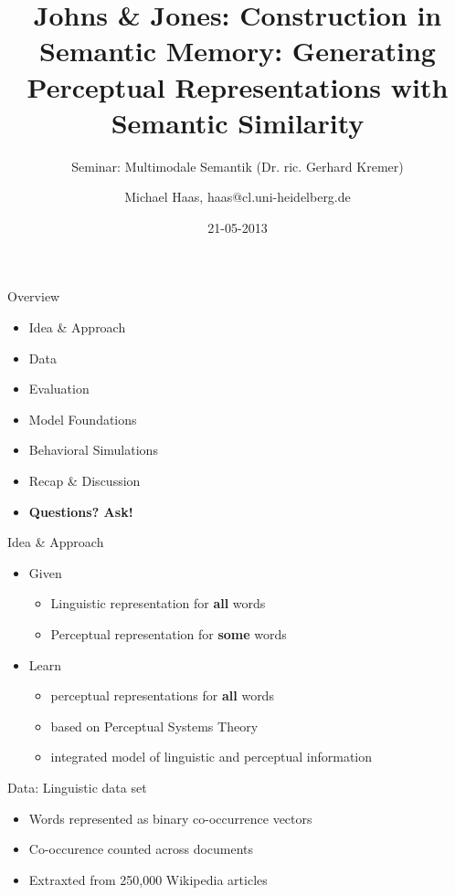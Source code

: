 \documentclass[12pt,a4paper]{beamer}
\author{Michael Haas, haas@cl.uni-heidelberg.de}
\title{Johns \& Jones: Construction in Semantic Memory: Generating Perceptual Representations with Semantic Similarity}
\subtitle{Seminar: Multimodale Semantik (Dr. ric. Gerhard Kremer)}
\date{21-05-2013}
\begin{document}
\begin{frame}
\maketitle
\end{frame}

\begin{frame}{Overview}
\begin{itemize}
\item Idea \& Approach %
\item Data
\item Evaluation
    \item Model Foundations
    \item Behavioral Simulations
\item Recap \& Discussion
\item \textbf{Questions? Ask!}
\end{itemize}
\end{frame}


\begin{frame}{Idea \& Approach}
\begin{itemize}
\item Given
    \begin{itemize}
    \item Linguistic representation for \textbf{all} words
    \item Perceptual representation for \textbf{some} words
    \end{itemize}
\item Learn
    \begin{itemize}
    \item perceptual representations for \textbf{all} words
    \item based on Perceptual Systems Theory
    \item integrated model of linguistic and perceptual information
    \end{itemize}
\end{itemize}
\end{frame}


\begin{frame}{Data: Linguistic data set}
\begin{itemize}
\item Words represented as binary co-occurrence vectors
\item Co-occurence counted across documents
\item Extraxted from 250,000 Wikipedia articles
\end{itemize}
\end{frame}
\end{document}
